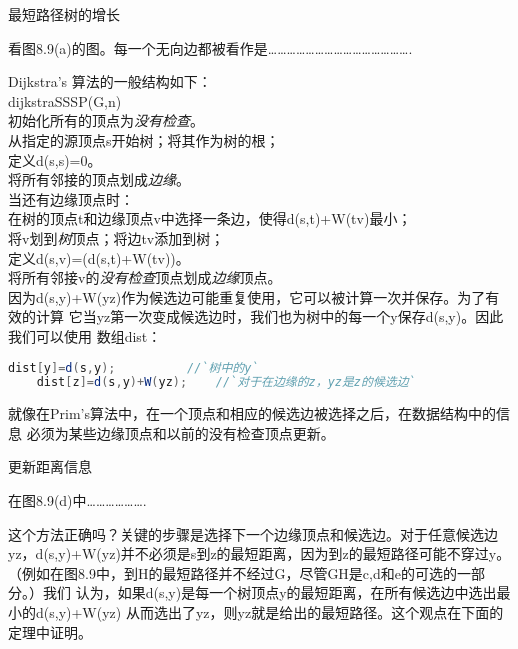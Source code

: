 \begin{example}
最短路径树的增长

看图8.9(a)的图。每一个无向边都被看作是……………………………………….
\end{example}

Dijkstra's 算法的一般结构如下：\\
dijkstraSSSP(G,n)\\
\indent    初始化所有的顶点为\emph{没有检查}。\\
\indent     从指定的源顶点s开始树；将其作为树的根；\\
\indent     定义d(s,s)=0。\\
\indent     将所有邻接的顶点划成\emph{边缘}。\\
\indent     当还有边缘顶点时：\\
\indent \indent         在树的顶点t和边缘顶点v中选择一条边，使得d(s,t)+W(tv)最小；\\
\indent \indent         将v划到\emph{树}顶点；将边tv添加到树；\\
\indent \indent         定义d(s,v)=(d(s,t)+W(tv))。\\
\indent \indent         将所有邻接v的\emph{没有检查}顶点划成\emph{边缘}顶点。\\

因为d(s,y)+W(yz)作为候选边可能重复使用，它可以被计算一次并保存。为了有效的计算
它当yz第一次变成候选边时，我们也为树中的每一个y保存d(s,y)。因此我们可以使用
数组dist：
\begin{lstlisting}[language={Java},keywordstyle=\color{blue!70}, commentstyle=\color{red!50!green!50!blue!50}]
    dist[y]=d(s,y);          //`树中的y`
    dist[z]=d(s,y)+W(yz);    //`对于在边缘的z，yz是z的候选边`
\end{lstlisting}
就像在Prim's算法中，在一个顶点和相应的候选边被选择之后，在数据结构中的信息
必须为某些边缘顶点和以前的没有检查顶点更新。

\begin{example}
更新距离信息

在图8.9(d)中……………….
\end{example}

这个方法正确吗？关键的步骤是选择下一个边缘顶点和候选边。对于任意候选边
yz，d(s,y)+W(yz)并不必须是s到z的最短距离，因为到z的最短路径可能不穿过y。
（例如在图8.9中，到H的最短路径并不经过G，尽管GH是c,d和e的可选的一部分。）我们
认为，如果d(s,y)是每一个树顶点y的最短距离，在所有候选边中选出最小的d(s,y)+W(yz)
从而选出了yz，则yz就是给出的最短路径。这个观点在下面的定理中证明。

